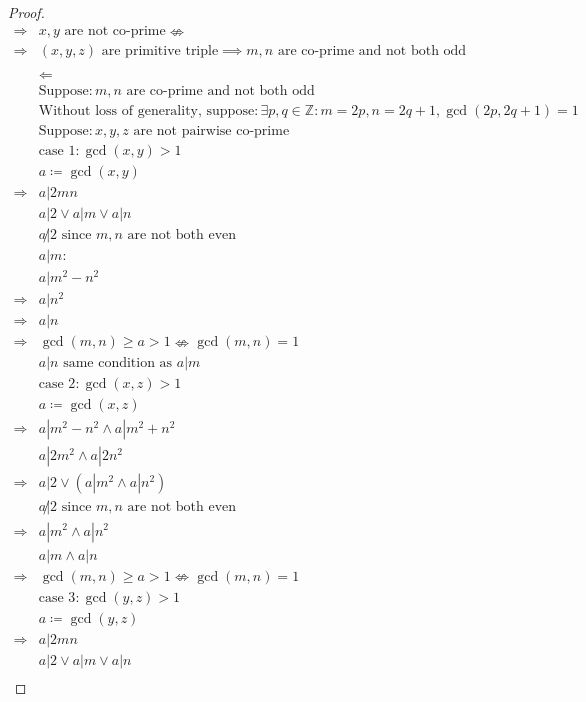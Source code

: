 \documentclass{article}
\begin{document}
\begin{proof}
\begin{align*}
        \Rightarrow&x,y\text{ are not co-prime}\nLeftrightarrow\\
        \Rightarrow&(x,y,z)\text{ are primitive triple}\implies m,n\text{ are co-prime and not both odd}\\
        &\\
        &\Leftarrow\\
        &\text{Suppose}: m,n\text{ are co-prime and not both odd}\\
        &\text{Without loss of generality, suppose}: \exists p,q\in\mathbb{Z}: m=2p,n=2q+1,\gcd(2p,2q+1)=1\\
        &\text{Suppose}: x,y,z\text{ are not pairwise co-prime}\\
        &\text{case }1:\gcd(x,y)>1\\
        &a\coloneqq\gcd(x,y)\\
        \Rightarrow&a|2mn\\
        &a|2\lor a|m\lor a|n\\
        &a \not| 2\text{ since }m,n\text{ are not both even}\\
        &a |m:\\
        &a|m^2-n^2\\
        \Rightarrow&a|n^2\\
        \Rightarrow&a|n\\
        \Rightarrow&\gcd(m,n)\geqslant a>1\nLeftrightarrow\gcd(m,n)=1\\
        &a|n\text{ same condition as }a|m\\
        &\text{case 2}:\gcd(x,z)>1\\
        &a\coloneqq \gcd(x,z)\\
        \Rightarrow&a|m^2-n^2\land a|m^2+n^2\\
        &a|2m^2\land a|2n^2\\
        \Rightarrow&a|2\lor (a|m^2\land a|n^2)\\
        &a\not|2\text{ since }m,n\text{ are not both even}\\
        \Rightarrow&a|m^2\land a|n^2\\
        &a|m\land a|n\\
        \Rightarrow&\gcd(m,n)\geqslant a>1\nLeftrightarrow\gcd(m,n)=1\\
        &\text{case 3}:\gcd(y,z)>1\\
        &a\coloneqq\gcd(y,z)\\
        \Rightarrow&a|2mn\\
        &a|2\lor a|m\lor a|n\\

\end{align*}
\end{proof}
\end{document}
